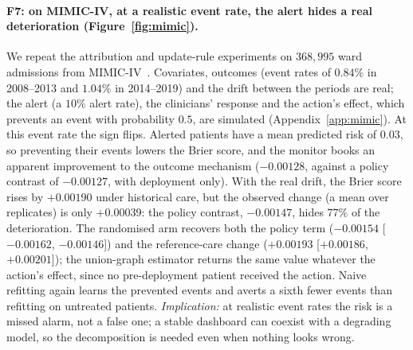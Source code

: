 \documentclass[letterpaper]{article} %
\begin{document}
\paragraph{F7: on MIMIC-IV, at a realistic event rate, the alert hides a real
deterioration (Figure~\ref{fig:mimic}).} We repeat the attribution and
update-rule experiments on $368{,}995$ ward admissions from
MIMIC-IV~\citep{johnson2023mimic}. Covariates, outcomes (event rates of
$0.84\%$ in 2008--2013 and $1.04\%$ in 2014--2019) and the drift between the
periods are real; the alert (a $10\%$ alert rate), the clinicians' response and
the action's effect, which prevents an event with probability $0.5$, are
simulated (Appendix~\ref{app:mimic}). At this event rate the sign flips.
Alerted patients have a mean predicted risk of $0.03$, so preventing their
events lowers the Brier score, and the monitor books an apparent improvement
to the outcome mechanism ($-0.00128$, against a policy contrast of $-0.00127$,
with deployment only). With the real drift, the Brier score rises by
$+0.00190$ under historical care, but the observed change (a mean over
replicates) is only $+0.00039$: the policy contrast, $-0.00147$, hides $77\%$
of the deterioration. The randomised arm recovers both the policy term
($-0.00154$ [$-0.00162$, $-0.00146$]) and the reference-care change ($+0.00193$
[$+0.00186$, $+0.00201$]); the union-graph estimator returns the same value
whatever the action's effect, since no pre-deployment patient received the
action. Naive refitting again learns the prevented events and averts a sixth
fewer events than refitting on untreated patients. \emph{Implication:} at
realistic event rates the risk is a missed alarm, not a false one; a stable
dashboard can coexist with a degrading model, so the decomposition is needed
even when nothing looks wrong.
\end{document}
